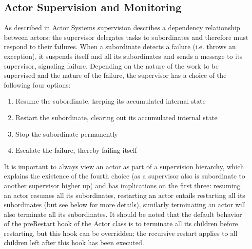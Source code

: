   \subsection{Actor Supervision and Monitoring}
  As described in Actor Systems supervision describes a dependency relationship between actors: the supervisor delegates tasks to subordinates and therefore must respond to their failures. When a subordinate detects a failure (i.e. throws an exception), it suspends itself and all its subordinates and sends a message to its supervisor, signaling failure. Depending on the nature of the work to be supervised and the nature of the failure, the supervisor has a choice of the following four options:
  \begin{enumerate}
    \item Resume the subordinate, keeping its accumulated internal state
    \item Restart the subordinate, clearing out its accumulated internal state
    \item Stop the subordinate permanently
    \item Escalate the failure, thereby failing itself
  \end{enumerate}
  It is important to always view an actor as part of a supervision hierarchy, which explains the existence of the fourth choice (as a supervisor also is subordinate to another supervisor higher up) and has implications on the first three: resuming an actor resumes all its subordinates, restarting an actor entails restarting all its subordinates (but see below for more details), similarly terminating an actor will also terminate all its subordinates. It should be noted that the default behavior of the preRestart hook of the Actor class is to terminate all its children before restarting, but this hook can be overridden; the recursive restart applies to all children left after this hook has been executed.

